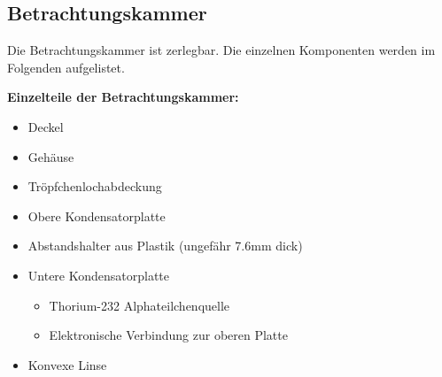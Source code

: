 \subsection{Betrachtungskammer}\label{sub:viewingChamber}
Die Betrachtungskammer ist zerlegbar. Die einzelnen Komponenten werden im Folgenden aufgelistet.

\noindent \textbf{Einzelteile der Betrachtungskammer:}

\begin{itemize}\label{item:betrachtungskammer}
	\item Deckel
	\item Gehäuse
	\item Tröpfchenlochabdeckung
	\item Obere Kondensatorplatte
	\item Abstandshalter aus Plastik (ungefähr 7.6mm dick)
	\item Untere Kondensatorplatte
	\begin{itemize}
		\item Thorium-232 Alphateilchenquelle
		\item Elektronische Verbindung zur oberen Platte
	\end{itemize}
	\item Konvexe Linse
\end{itemize}

